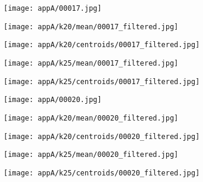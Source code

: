 \documentclass[draft,final]{vutinfth} %
\begin{document}
\begin{appendices}
\begin{figure}[h]
\centering
  \begin{subfigure}[t]{0.19\columnwidth}
    \centering
    \texttt{[image: appA/00017.jpg]}
  \end{subfigure}
  \begin{subfigure}[t]{0.19\columnwidth}
    \centering
    \texttt{[image: appA/k20/mean/00017\_filtered.jpg]}
  \end{subfigure}
  \begin{subfigure}[t]{0.19\columnwidth}
    \centering
    \texttt{[image: appA/k20/centroids/00017\_filtered.jpg]}
  \end{subfigure}
  \begin{subfigure}[t]{0.19\columnwidth}
    \centering
    \texttt{[image: appA/k25/mean/00017\_filtered.jpg]}
  \end{subfigure}
  \begin{subfigure}[t]{0.19\columnwidth}
    \centering
    \texttt{[image: appA/k25/centroids/00017\_filtered.jpg]}
  \end{subfigure}
\caption{}
\end{figure}  

\begin{figure}[h]
\centering
  \begin{subfigure}[t]{0.19\columnwidth}
    \centering
    \texttt{[image: appA/00020.jpg]}
  \end{subfigure}
  \begin{subfigure}[t]{0.19\columnwidth}
    \centering
    \texttt{[image: appA/k20/mean/00020\_filtered.jpg]}
  \end{subfigure}
  \begin{subfigure}[t]{0.19\columnwidth}
    \centering
    \texttt{[image: appA/k20/centroids/00020\_filtered.jpg]}
  \end{subfigure}
  \begin{subfigure}[t]{0.19\columnwidth}
    \centering
    \texttt{[image: appA/k25/mean/00020\_filtered.jpg]}
  \end{subfigure}
  \begin{subfigure}[t]{0.19\columnwidth}
    \centering
    \texttt{[image: appA/k25/centroids/00020\_filtered.jpg]}
  \end{subfigure}
\caption{}
\end{figure}  


\end{appendices}
\end{document}
